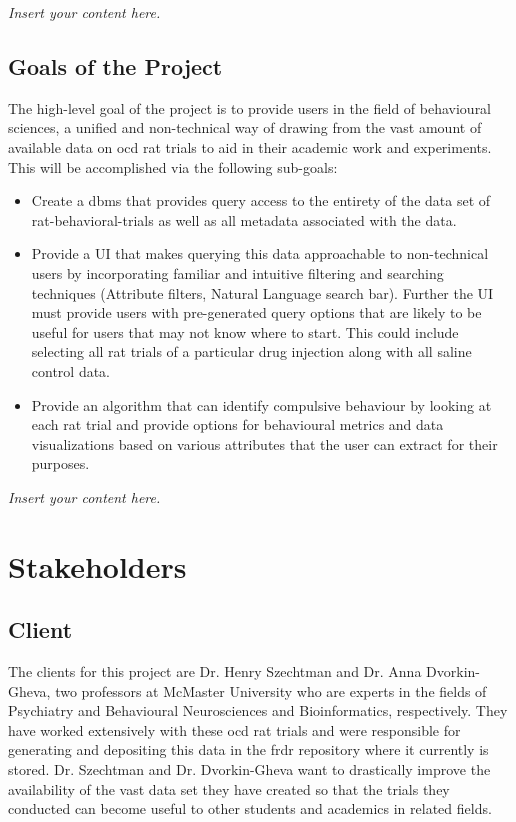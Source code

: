 \documentclass[12pt]{article}
\newcommand{\lips}{\textit{Insert your content here.}}
\begin{document}
\lips

\subsection{Goals of the Project}

\par{The high-level goal of the project is to provide users in the field of behavioural sciences,
a unified and non-technical way of drawing from the vast amount of available data on \gls{ocd} rat trials
to aid in their academic work and experiments. This will be accomplished via the following sub-goals:}

\begin{itemize}
    \item Create a \gls{dbms} that provides \gls{query} access to the entirety of the data set of \gls{rat-behavioral-trials} as well as all \gls{metadata} associated with the data.
    \item Provide a UI that makes querying this data approachable to non-technical users by incorporating familiar and intuitive filtering and searching techniques
    (Attribute filters, Natural Language search bar). Further the UI must provide users with pre-generated query options that are likely to
    be useful for users that may not know where to start. This could include selecting all rat trials of a particular drug injection along with
    all saline control data.
    \item Provide an algorithm that can identify compulsive behaviour by looking at each rat trial
    and provide options for behavioural metrics and data visualizations based on various attributes that the user can extract 
    for their purposes.
\end{itemize}


\lips
\section{Stakeholders}

\subsection{Client}
\label{sec:2.1client}
\par{The clients for this project are Dr. Henry Szechtman and Dr. Anna Dvorkin-Gheva, two professors at McMaster University who are experts in
the fields of Psychiatry and Behavioural Neurosciences and Bioinformatics, respectively. They have worked extensively with these \gls{ocd} rat trials and
were responsible for generating and depositing this data in the \gls{frdr} repository where it currently is stored. Dr. Szechtman and Dr. Dvorkin-Gheva want
to drastically improve the availability of the vast data set they have created so that the trials they conducted can become useful to other students and academics in related fields. \\\\}
\end{document}
